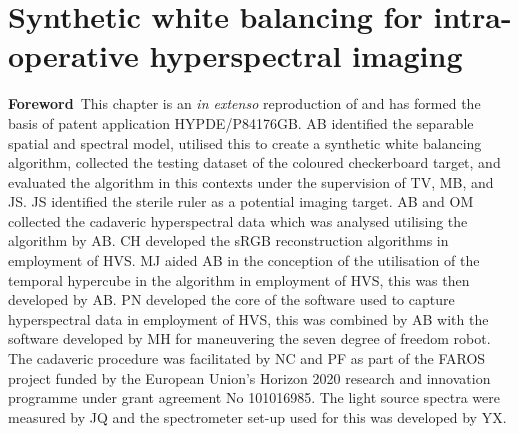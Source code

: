 % 
\chapter[Synthetic white balancing]{Synthetic white balancing for intra-operative hyperspectral imaging}
\label{chap:SWB}

\begin{center}
\begin{minipage}[b]{0.9\linewidth}
\small
\textbf{Foreword\,}
This chapter is an \emph{in extenso} reproduction of \cite{Bahl2023} and has formed the basis of patent application HYPDE/P84176GB. 
\newline
AB identified the separable spatial and spectral model, utilised this to create a synthetic white balancing algorithm, collected the testing dataset of the coloured checkerboard target, and evaluated the algorithm in this contexts under the supervision of TV, MB, and JS. JS identified the sterile ruler as a potential imaging target. AB and OM collected the cadaveric hyperspectral data which was analysed utilising the algorithm by AB. CH developed the sRGB reconstruction algorithms in employment of HVS. MJ aided AB in the conception of the utilisation of the temporal hypercube in the algorithm in employment of HVS, this was then developed by AB. PN developed the core of the software used to capture hyperspectral data in employment of HVS, this was combined by AB with the software developed by MH for maneuvering the seven degree of freedom robot. The cadaveric procedure was facilitated by NC and PF as part of the FAROS project funded by the European Union’s Horizon 2020 research and innovation programme under grant agreement No 101016985. The light source spectra were measured by JQ and the spectrometer set-up used for this was developed by YX. 
\end{minipage}
\end{center}

\minitoc



